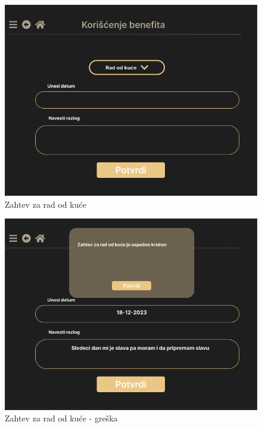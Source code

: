\documentclass[a4paper]{article}
\begin{document}
\begin{figure} [!ht]
    \begin{center}
        \includegraphics[scale=0.25]{UI/Zaposleni/ZahtevRadOdKuceOverview.png}
    \end{center}
\caption{Zahtev za rad od kuće}
\end{figure}

\begin{figure} [!ht]
    \begin{center}
        \includegraphics[scale=0.25]{UI/Zaposleni/ZahtevRadOdKuceSuccess.png}
    \end{center}
\caption{Zahtev za rad od kuće - greška}
\end{figure}
\end{document}
